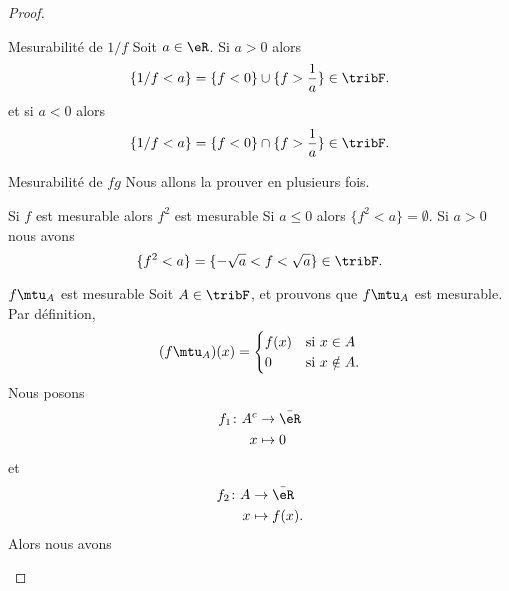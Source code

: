 \begin{proof}
\begin{subproof}
    \item[Mesurabilité de \( 1/f\)]
        Soit \( a\in \eR\). Si \( a>0\) alors
        \begin{equation}
            \{ 1/f<a \}=\{ f<0 \}\cup\{ f>\frac{1}{ a } \}\in\tribF.
        \end{equation}
        et si \( a<0\) alors
        \begin{equation}
            \{ 1/f<a \}=\{ f<0 \}\cap\{ f>\frac{1}{ a } \}\in\tribF.
        \end{equation}
    \item[Mesurabilité de \( fg\)]
        Nous allons la prouver en plusieurs fois.
        \begin{subproof}
        \item[Si \( f\) est mesurable alors \( f^2\) est mesurable]
            Si \( a\leq 0\) alors \( \{ f^2<a \}=\emptyset\). Si \( a>0\) nous avons
            \begin{equation}
                 \{ f^2<a \}=\{ -\sqrt{a}<f<\sqrt{a} \}\in\tribF.
            \end{equation}
        \item[\( f\mtu_A\) est mesurable]
            Soit \( A\in \tribF\), et prouvons que \( f\mtu_A\) est mesurable. Par définition,
            \begin{equation}
                (f\mtu_A)(x)=\begin{cases}
                    f(x)    &   \text{si } x\in A\\
                    0    &    \text{si } x\notin A.
                \end{cases}
            \end{equation}
            Nous posons \begin{equation}
                \begin{aligned}
                    f_1\colon A^c&\to \bar \eR \\
                    x&\mapsto 0
                \end{aligned}
            \end{equation}
            et
            \begin{equation}
                \begin{aligned}
                    f_2\colon A&\to \bar \eR \\
                    x&\mapsto f(x).
                \end{aligned}
            \end{equation}
            Alors nous avons
            \begin{equation}

\end{equation}
\end{subproof}
\end{subproof}
\end{proof}
